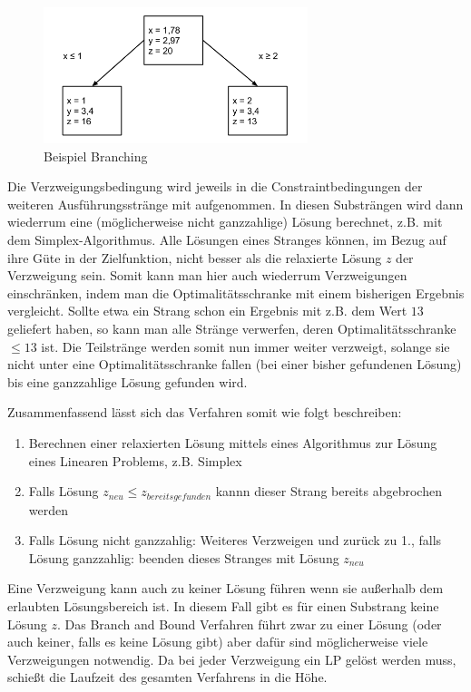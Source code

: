 \documentclass[a4paper, 11pt]{article}
\begin{document}
\begin{figure}
  \centering
  \includegraphics[width=\linewidth,height=150px,keepaspectratio]{branching.png}
  \caption{Beispiel Branching}
  \label{img:branching}
\end{figure}

Die Verzweigungsbedingung wird jeweils in die Constraintbedingungen
der weiteren Ausführungsstränge mit aufgenommen. In diesen Substrängen wird
dann wiederrum eine (möglicherweise nicht ganzzahlige) Lösung berechnet,
z.B. mit dem Simplex-Algorithmus. Alle Lösungen eines Stranges können, im Bezug
auf ihre Güte in der Zielfunktion, nicht besser als die relaxierte
Lösung $z$ der Verzweigung sein. Somit kann man hier auch wiederrum Verzweigungen
einschränken, indem man die Optimalitätsschranke mit einem bisherigen Ergebnis
vergleicht. Sollte etwa ein Strang schon ein Ergebnis mit z.B. dem Wert $13$
geliefert haben, so kann man alle Stränge verwerfen, deren Optimalitätsschranke
$\leq 13$ ist. Die Teilstränge werden somit nun immer weiter verzweigt, solange
sie nicht unter eine Optimalitätsschranke fallen (bei einer bisher gefundenen
Lösung) bis eine ganzzahlige Lösung gefunden wird.

Zusammenfassend lässt sich das Verfahren somit wie folgt beschreiben:

\begin{enumerate}
  \item Berechnen einer relaxierten Lösung mittels eines Algorithmus
  zur Lösung eines Linearen Problems, z.B. Simplex
  \item Falls Lösung $z_{neu} \leq z_{bereits gefunden}$ kannn dieser
  Strang bereits abgebrochen werden
  \item Falls Lösung nicht ganzzahlig: Weiteres Verzweigen und zurück
  zu 1., falls Lösung
  ganzzahlig: beenden dieses Stranges mit Lösung $z_{neu}$
\end{enumerate}

Eine Verzweigung kann auch zu keiner Lösung führen wenn sie außerhalb
dem erlaubten Lösungsbereich ist. In diesem Fall gibt es für einen Substrang
keine Lösung $z$.
Das Branch and Bound Verfahren führt zwar zu einer Lösung (oder auch keiner,
falls es keine Lösung gibt) aber dafür sind möglicherweise viele Verzweigungen
notwendig. Da bei jeder Verzweigung ein LP gelöst werden muss, schießt
die Laufzeit des gesamten Verfahrens in die Höhe.
\end{document}
